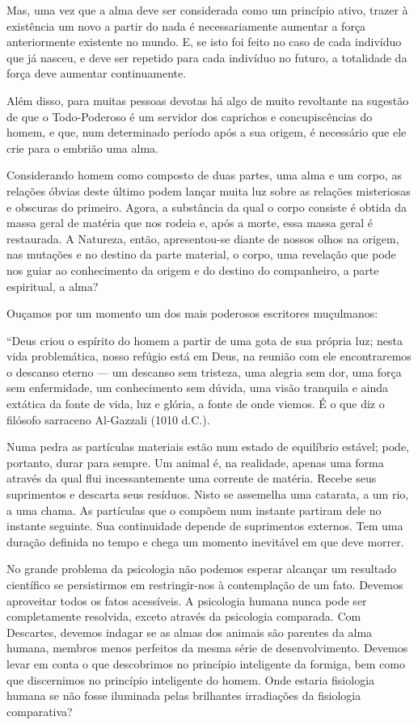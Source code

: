 \documentclass[11pt,a5paper,twoside,openany]{book}
\begin{document}
Mas, uma vez que a alma deve ser considerada como um princípio ativo, trazer à existência um novo a partir do nada é necessariamente aumentar a força anteriormente existente no mundo. E, se isto foi feito no caso de cada indivíduo que já nasceu, e deve ser repetido para cada indivíduo no futuro, a totalidade da força deve aumentar continuamente.

Além disso, para muitas pessoas devotas há algo de muito revoltante na sugestão de que o Todo-Poderoso é um servidor dos caprichos e concupiscências do homem, e que, num determinado período após a sua origem, é necessário que ele crie para o embrião uma alma.

Considerando homem como composto de duas partes, uma alma e um corpo, as relações óbvias deste último podem lançar muita luz sobre as relações misteriosas e obscuras do primeiro. Agora, a substância da qual o corpo consiste é obtida da massa geral de matéria que nos rodeia e, após a morte, essa massa geral é restaurada. A Natureza, então, apresentou-se diante de nossos olhos na origem, nas mutações e no destino da parte material, o corpo, uma revelação que pode nos guiar ao conhecimento da origem e do destino do companheiro, a parte espiritual, a alma?

Ouçamos por um momento um dos mais poderosos escritores muçulmanos:

“Deus criou o espírito do homem a partir de uma gota de sua própria luz; nesta vida problemática, nosso refúgio está em Deus, na reunião com ele encontraremos o descanso eterno — um descanso sem tristeza, uma alegria sem dor, uma força sem enfermidade, um conhecimento sem dúvida, uma visão tranquila e ainda extática da fonte de vida, luz e glória, a fonte de onde viemos. É o que diz o filósofo sarraceno Al-Gazzali (1010 d.C.).

Numa pedra as partículas materiais estão num estado de equilíbrio estável; pode, portanto, durar para sempre. Um animal é, na realidade, apenas uma forma através da qual flui incessantemente uma corrente de matéria. Recebe seus suprimentos e descarta seus resíduos. Nisto se assemelha uma catarata, a um rio, a uma chama. As partículas que o compõem num instante partiram dele no instante seguinte. Sua continuidade depende de suprimentos externos. Tem uma duração definida no tempo e chega um momento inevitável em que deve morrer.

No grande problema da psicologia não podemos esperar alcançar um resultado científico se persistirmos em restringir-nos à contemplação de um fato. Devemos aproveitar todos os fatos acessíveis. A psicologia humana nunca pode ser completamente resolvida, exceto através da psicologia comparada. Com Descartes, devemos indagar se as almas dos animais são parentes da alma humana, membros menos perfeitos da mesma série de desenvolvimento. Devemos levar em conta o que descobrimos no princípio inteligente da formiga, bem como que discernimos no princípio inteligente do homem. Onde estaria fisiologia humana se não fosse iluminada pelas brilhantes irradiações da fisiologia comparativa?
\end{document}
